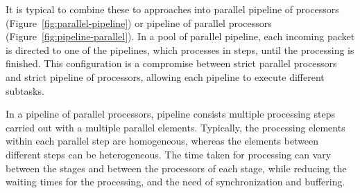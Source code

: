 It is typical to combine these to approaches into parallel pipeline of processors (Figure~\ref{fig:parallel-pipeline}) or pipeline of parallel processors (Figure~\ref{fig:pipeline-parallel}). In a pool of parallel pipeline, each incoming packet is directed to one of the pipelines, which processes in steps, until the processing is finished. This configuration is a compromise between strict parallel processors and strict pipeline of processors, allowing each pipeline to execute different subtasks.~\cite{Giladi:2008:Network}

In a pipeline of parallel processors, pipeline consists multiple processing steps carried out with a multiple parallel elements. Typically, the processing elements within each parallel step are homogeneous, whereas the elements between different steps can be heterogeneous. The time taken for processing can vary between the stages and between the processors of each stage, while reducing the waiting times for the processing, and the need of synchronization and buffering.~\cite{Giladi:2008:Network}

